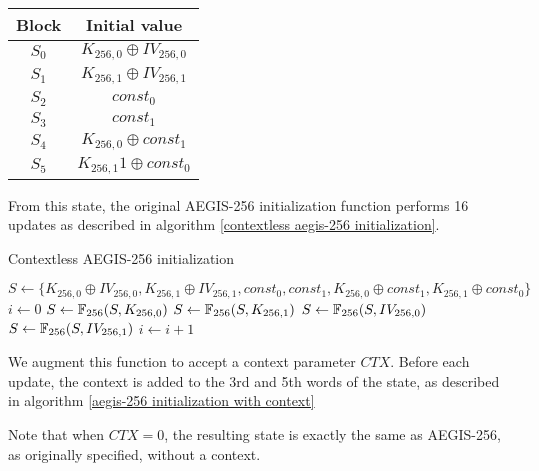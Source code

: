 \documentclass[envcountsame,runningheads,notitlepage]{llncs}
\begin{document}
\begin{center}
  \begin{tabular}{|c|c|}
    \hline
    Block & Initial value                 \\
    \hline
    $S_0$ & $K_{256,0} \oplus IV_{256,0}$ \\
    \hline
    $S_1$ & $K_{256,1} \oplus IV_{256,1}$ \\
    \hline
    $S_2$ & $const_0$                     \\
    \hline
    $S_3$ & $const_1$                     \\
    \hline
    $S_4$ & $K_{256,0} \oplus const_1$    \\
    \hline
    $S_5$ & $K_{256,1}1 \oplus const_0$   \\
    \hline
  \end{tabular}
\end{center}

From this state, the original AEGIS-256 initialization function performs 16 updates as described in algorithm \ref{contextless aegis-256 initialization}.

\begin{algorithm}
  \caption{Contextless AEGIS-256 initialization}
  \label{contextless aegis-256 initialization}
  \begin{algorithmic}
    \State $S \gets \{ K_{256,0} \oplus IV_{256,0}, K_{256,1} \oplus IV_{256,1}, const_0, const_1, K_{256,0} \oplus const_1, K_{256,1} \oplus const_0 \}$
    \State $i \gets 0$
    \State $S \gets \mathbb{F}_{256}(S, K_{256,0})$
    \State $S \gets \mathbb{F}_{256}(S, K_{256,1})$
    \State $S \gets \mathbb{F}_{256}(S, IV_{256,0})$
    \State $S \gets \mathbb{F}_{256}(S, IV_{256,1})$
    \State $i \gets i+1$
    \EndWhile
    \EndFunction
  \end{algorithmic}
\end{algorithm}

We augment this function to accept a context parameter $CTX$.
Before each update, the context is added to the 3rd and 5th words of the state, as described in algorithm \ref{aegis-256 initialization with context}

Note that when $CTX = 0$, the resulting state is exactly the same as AEGIS-256, as originally specified, without a context.
\end{document}
